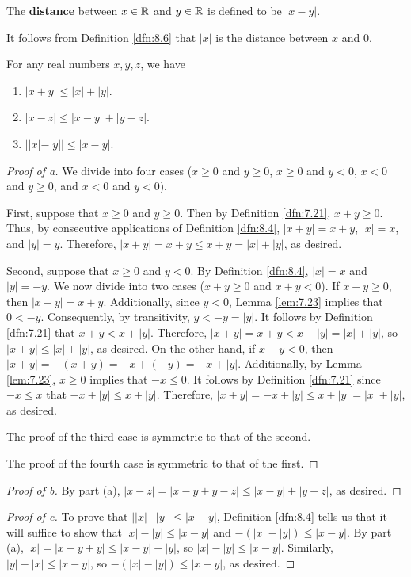 \documentclass[../main.tex]{subfiles}
\begin{document}
\begin{definition}\label{dfn:8.6}
    The \textbf{distance} between $x\in\mathbb{R}$ and $y\in\mathbb{R}$ is defined to be $|x-y|$.
\end{definition}

\begin{remark}\label{rmk:8.7}
    It follows from Definition \ref{dfn:8.6} that $|x|$ is the distance between $x$ and $0$.
\end{remark}

\begin{lemma}\label{lem:8.8}
    For any real numbers $x,y,z$, we have
    \begin{enumerate}[label={\textup{(}\alph*\textup{)}}]
        \item $|x+y|\leq|x|+|y|$.
        \item $|x-z|\leq|x-y|+|y-z|$.
        \item $||x|-|y||\leq|x-y|$.
    \end{enumerate}
    \begin{proof}[Proof of a]
        We divide into four cases ($x\geq 0$ and $y\geq 0$, $x\geq 0$ and $y<0$, $x<0$ and $y\geq 0$, and $x<0$ and $y<0$).\par
        First, suppose that $x\geq 0$ and $y\geq 0$. Then by Definition \ref{dfn:7.21}, $x+y\geq 0$. Thus, by consecutive applications of Definition \ref{dfn:8.4}, $|x+y|=x+y$, $|x|=x$, and $|y|=y$. Therefore, $|x+y|=x+y\leq x+y=|x|+|y|$, as desired.\par
        Second, suppose that $x\geq 0$ and $y<0$. By Definition \ref{dfn:8.4}, $|x|=x$ and $|y|=-y$. We now divide into two cases ($x+y\geq 0$ and $x+y<0$). If $x+y\geq 0$, then $|x+y|=x+y$. Additionally, since $y<0$, Lemma \ref{lem:7.23} implies that $0<-y$. Consequently, by transitivity, $y<-y=|y|$. It follows by Definition \ref{dfn:7.21} that $x+y<x+|y|$. Therefore, $|x+y|=x+y<x+|y|=|x|+|y|$, so $|x+y|\leq|x|+|y|$, as desired. On the other hand, if $x+y<0$, then $|x+y|=-(x+y)=-x+(-y)=-x+|y|$. Additionally, by Lemma \ref{lem:7.23}, $x\geq 0$ implies that $-x\leq 0$. It follows by Definition \ref{dfn:7.21} since $-x\leq x$ that $-x+|y|\leq x+|y|$. Therefore, $|x+y|=-x+|y|\leq x+|y|=|x|+|y|$, as desired.\par
        The proof of the third case is symmetric to that of the second.\par
        The proof of the fourth case is symmetric to that of the first.
    \end{proof}
    \begin{proof}[Proof of b]
        By part (a), $|x-z|=|x-y+y-z|\leq |x-y|+|y-z|$, as desired.
    \end{proof}
    \begin{proof}[Proof of c]
        To prove that $||x|-|y||\leq|x-y|$, Definition \ref{dfn:8.4} tells us that it will suffice to show that $|x|-|y|\leq|x-y|$ and $-(|x|-|y|)\leq|x-y|$. By part (a), $|x|=|x-y+y|\leq|x-y|+|y|$, so $|x|-|y|\leq|x-y|$. Similarly, $|y|-|x|\leq|x-y|$, so $-(|x|-|y|)\leq|x-y|$, as desired.
    \end{proof}
\end{lemma}
\end{document}
